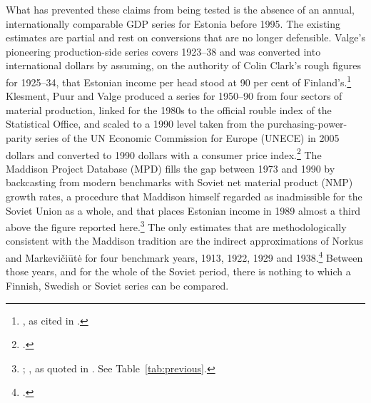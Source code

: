 \documentclass[12pt,a4paper]{article}
\begin{document}
What has prevented these claims from being tested is the absence of an annual, internationally comparable GDP series for Estonia before 1995. The existing estimates are partial and rest on conversions that are no longer defensible. Valge's pioneering production-side series covers 1923--38 and was converted into international dollars by assuming, on the authority of Colin Clark's rough figures for 1925--34, that Estonian income per head stood at 90 per cent of Finland's.\footnote{\autocite{clark1938}, as cited in \autocite[2725--6]{valge2003all}.} Klesment, Puur and Valge produced a series for 1950--90 from four sectors of material production, linked for the 1980s to the official rouble index of the Statistical Office, and scaled to a 1990 level taken from the purchasing-power-parity series of the UN Economic Commission for Europe (UNECE) in 2005 dollars and converted to 1990 dollars with a consumer price index.\footnote{\autocite[39--44]{klesment2010}.} The Maddison Project Database (MPD) fills the gap between 1973 and 1990 by backcasting from modern benchmarks with Soviet net material product (NMP) growth rates, a procedure that Maddison himself regarded as inadmissible for the Soviet Union as a whole, and that places Estonian income in 1989 almost a third above the figure reported here.\footnote{\autocite[307--8]{Maddison1998b}; \autocite{mpd2020}, as quoted in \autocite[155]{norkus_restorations}. See Table~\ref{tab:previous}.} The only estimates that are methodologically consistent with the Maddison tradition are the indirect approximations of Norkus and Markevi\v{c}i\={u}t\.{e} for four benchmark years, 1913, 1922, 1929 and 1938.\footnote{\autocite{norkusmark2021}.} Between those years, and for the whole of the Soviet period, there is nothing to which a Finnish, Swedish or Soviet series can be compared.
\end{document}
